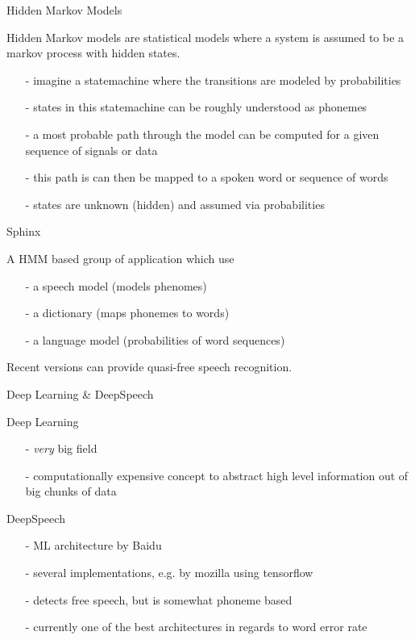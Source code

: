 \documentclass{beamer}
\begin{document}
	\begin{frame}{Hidden Markov Models}
		\begin{alertblock}{Hidden Markov models are statistical models where a system is assumed to be a markov process with hidden states.}
			\begin{itemize}
				\item[-] imagine a statemachine where the transitions are modeled by probabilities
				\item[-] states in this statemachine can be roughly understood as phonemes
				\item[-] a most probable path through the model can be computed for a given sequence of signals or data 
				\item[-] this path is can then be mapped to a spoken word or sequence of words
				\item[-] states are unknown (hidden) and assumed via probabilities
			\end{itemize}
		\end{alertblock}
	\end{frame}
	
	\begin{frame}{Sphinx}
		\begin{alertblock}{A HMM based group of application which use}
			\begin{itemize}
				\item[-] a speech model (models phenomes)
				\item[-] a dictionary (maps phonemes to words)
				\item[-] a language model (probabilities of word sequences)
			\end{itemize}
			
			Recent versions can provide quasi-free speech recognition.
		\end{alertblock}
	\end{frame}
	
	\begin{frame}{Deep Learning \& DeepSpeech}
		\begin{alertblock}{Deep Learning}
			\begin{itemize}
				\item[-] \emph{very} big field
				\item[-] computationally expensive concept to abstract high level information out of big chunks of data
			\end{itemize}
		\end{alertblock}
		\pause
		\begin{alertblock}{DeepSpeech}
			\begin{itemize}
				\item[-] ML architecture by Baidu
				\item[-] several implementations, e.g. by mozilla using tensorflow
				\item[-] detects free speech, but is somewhat phoneme based
				\item[-] currently one of the best architectures in regards to word error rate
			\end{itemize}
		\end{alertblock}
	\end{frame}
	
\end{document}
